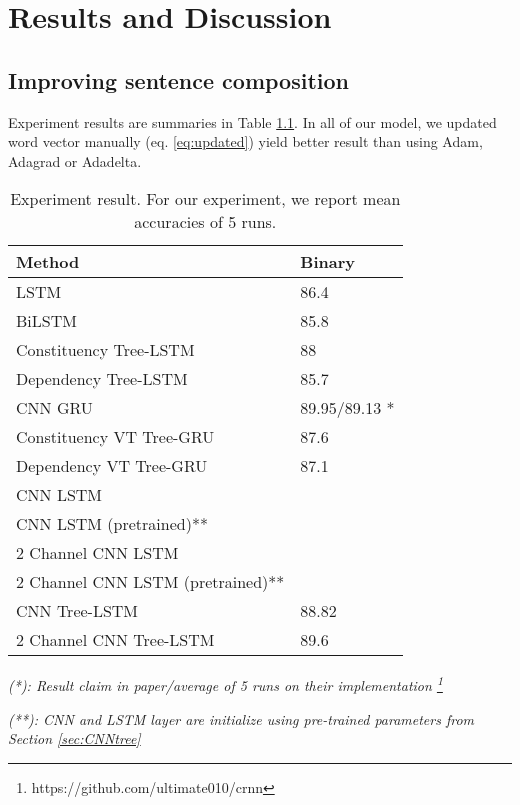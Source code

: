 \chapter{Results and Discussion}\label{result-discuss}


\section{Improving sentence composition}
Experiment results are summaries in Table \ref{table:experimentresult}. In all of our model, we updated word vector manually (eq. \ref{eq:updated}) yield better result than using Adam, Adagrad or Adadelta. 

\begin{table}[H]
	\centering
	\caption{Experiment result. For our experiment, we report mean accuracies of 5 runs.}
	\label{table:experimentresult}
	\begin{tabular}{ll}
		Method                                   & Binary \\ \hline
		LSTM                                     & 86.4   \\
		BiLSTM                                   & 85.8   \\ \hline
		Constituency Tree-LSTM \cite{treeLSTM} & 88     \\
		Dependency Tree-LSTM  \cite{treeLSTM}  & 85.7   \\ 
		CNN GRU \cite{cnn-rnn}		& 89.95/89.13 *	\\ \hline
		Constituency VT Tree-GRU                 & 87.6   \\
		Dependency VT Tree-GRU                   & 87.1   \\ \hline
		CNN LSTM 								&         \\
		CNN LSTM (pretrained)** 				&			\\ 
		2 Channel CNN LSTM						& 		\\
		2 Channel CNN LSTM (pretrained)**		& 		\\
		CNN Tree-LSTM                            & 88.82  \\
		2 Channel CNN Tree-LSTM  				& 89.6 
	\end{tabular}
\end{table}

\textit{(*): Result claim in paper/average of 5 runs on their implementation \footnote{https://github.com/ultimate010/crnn}}

\textit{(**): CNN and LSTM layer are initialize using pre-trained parameters from Section \ref{sec:CNNtree}}

